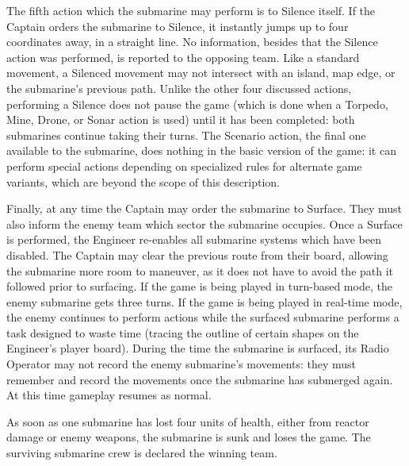 The fifth action which the submarine may perform is to Silence itself. If the Captain orders the submarine to Silence, it instantly jumps up to four coordinates away, in a straight line. No information, besides that the Silence action was performed, is reported to the opposing team. Like a standard movement, a Silenced movement may not intersect with an island, map edge, or the submarine's previous path. Unlike the other four discussed actions, performing a Silence does not pause the game (which is done when a Torpedo, Mine, Drone, or Sonar action is used) until it has been completed: both submarines continue taking their turns. The Scenario action, the final one available to the submarine, does nothing in the basic version of the game: it can perform special actions depending on specialized rules for alternate game variants, which are beyond the scope of this description.


Finally, at any time the Captain may order the submarine to Surface. They must also inform the enemy team which sector the submarine occupies. Once a Surface is performed, the Engineer re-enables all submarine systems which have been disabled. The Captain may clear the previous route from their board, allowing the submarine more room to maneuver, as it does not have to avoid the path it followed prior to surfacing. If the game is being played in turn-based mode, the enemy submarine gets three turns. If the game is being played in real-time mode, the enemy continues to perform actions while the surfaced submarine performs a task designed to waste time (tracing the outline of certain shapes on the Engineer's player board). During the time the submarine is surfaced, its Radio Operator may not record the enemy submarine's movements: they must remember and record the movements once the submarine has submerged again. At this time gameplay resumes as normal.

As soon as one submarine has lost four units of health, either from reactor damage or enemy weapons, the submarine is sunk and loses the game. The surviving submarine crew is declared the winning team.







